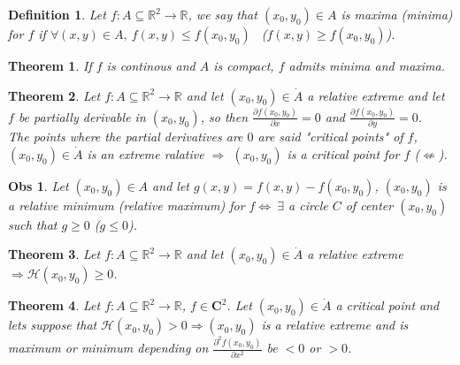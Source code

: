 \documentclass{article}
\newtheorem{theorem}{Theorem}
\newtheorem{definition}{Definition}
\newtheorem{observation}{Obs}
\begin{document}
        \begin{definition}
            Let $f : A \subseteq \mathbb{R}^2 \rightarrow \mathbb{R}$, we say that $(x_0,y_0) \in A$ is maxima (minima) for $f$ if $\forall (x,y) \in A, \ f(x,y) \leqslant f(x_0,y_0)$ \ ($f(x,y) \geqslant f(x_0,y_0)$). 
        \end{definition}
        \begin{theorem}
            If $f$ is continous and $A$ is compact, $f$ admits minima and maxima.
        \end{theorem}
        \begin{theorem}
            Let $f : A \subseteq \mathbb{R}^2 \rightarrow \mathbb{R}$ and let $(x_0,y_0) \in \dot{A}$ a relative extreme and let  $f$ be partially derivable in $(x_0,y_0)$, so then $\frac{\partial f(x_0,y_0)}{\partial x} = 0$ and $\frac{\partial f(x_0,y_0)}{\partial y} = 0$. \\
            The points where the partial derivatives are $0$ are said "critical points" of $f$, $(x_0,y_0) \in \dot{A}$ is an extreme ralative $\Rightarrow$ $(x_0,y_0)$ is a critical point for $f$ ($\nLeftarrow$).         
        \end{theorem}
        \begin{observation}
            Let $(x_0,y_0) \in A$ and let $g(x,y) = f(x,y) - f(x_0,y_0)$, $(x_0,y_0)$ is a relative minimum (relative maximum) for $f \Longleftrightarrow \ \exists$ a circle $C$ of center $(x_0,y_0)$ such that $g \geq 0$ ($g \leq 0$).
        \end{observation}
        \begin{theorem}
            Let $f : A \subseteq \mathbb{R}^2 \rightarrow \mathbb{R}$ and let $(x_0,y_0) \in \dot{A}$ a relative extreme $\Longrightarrow \mathcal{H}(x_0,y_0) \geqslant 0$.
        \end{theorem}
        \begin{theorem}
            Let $f : A \subseteq \mathbb{R}^2 \rightarrow \mathbb{R}$, $f \in \mathbf{C}^2$. Let $(x_0,y_0) \in \dot{A}$ a critical point and lets suppose that $\mathcal{H}(x_0,y_0) > 0 \Longrightarrow (x_0,y_0)$ is a relative extreme and is maximum or minimum depending on $\frac{\partial^2 f(x_0,y_0)}{\partial x^2}$ be $<0$ or $>0$.  
        \end{theorem}
\end{document}
